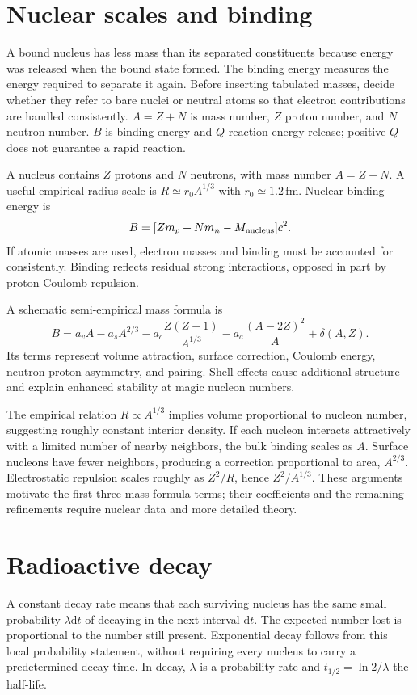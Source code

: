 \documentclass[11pt,oneside]{book}
\newcommand{\dd}{\mathrm{d}}
\theoremstyle{reviewstyle}
\begin{document}
\section{Nuclear scales and binding}
A bound nucleus has less mass than its separated constituents because energy was released when the bound state formed. The binding energy measures the energy required to separate it again. Before inserting tabulated masses, decide whether they refer to bare nuclei or neutral atoms so that electron contributions are handled consistently. $A=Z+N$ is mass number, $Z$ proton number, and $N$ neutron number. $B$ is binding energy and $Q$ reaction energy release; positive $Q$ does not guarantee a rapid reaction.

A nucleus contains $Z$ protons and $N$ neutrons, with mass number $A=Z+N$. A useful empirical radius scale is $R\simeq r_0A^{1/3}$ with $r_0\simeq1.2\,\mathrm{fm}$. Nuclear binding energy is
\begin{equation}B=[Zm_p+Nm_n-M_{\rm nucleus}]c^2.\end{equation}
If atomic masses are used, electron masses and binding must be accounted for consistently. Binding reflects residual strong interactions, opposed in part by proton Coulomb repulsion.

A schematic semi-empirical mass formula is
\begin{equation}B=a_vA-a_sA^{2/3}-a_c\frac{Z(Z-1)}{A^{1/3}}-a_a\frac{(A-2Z)^2}{A}+\delta(A,Z).\end{equation}
Its terms represent volume attraction, surface correction, Coulomb energy, neutron-proton asymmetry, and pairing. Shell effects cause additional structure and explain enhanced stability at magic nucleon numbers.

The empirical relation $R\propto A^{1/3}$ implies volume proportional to nucleon number, suggesting roughly constant interior density. If each nucleon interacts attractively with a limited number of nearby neighbors, the bulk binding scales as $A$. Surface nucleons have fewer neighbors, producing a correction proportional to area, $A^{2/3}$. Electrostatic repulsion scales roughly as $Z^2/R$, hence $Z^2/A^{1/3}$. These arguments motivate the first three mass-formula terms; their coefficients and the remaining refinements require nuclear data and more detailed theory.

\section{Radioactive decay}
A constant decay rate means that each surviving nucleus has the same small probability $\lambda\dd t$ of decaying in the next interval $\dd t$. The expected number lost is proportional to the number still present. Exponential decay follows from this local probability statement, without requiring every nucleus to carry a predetermined decay time. In decay, $\lambda$ is a probability rate and $t_{1/2}=\ln2/\lambda$ the half-life.
\end{document}
